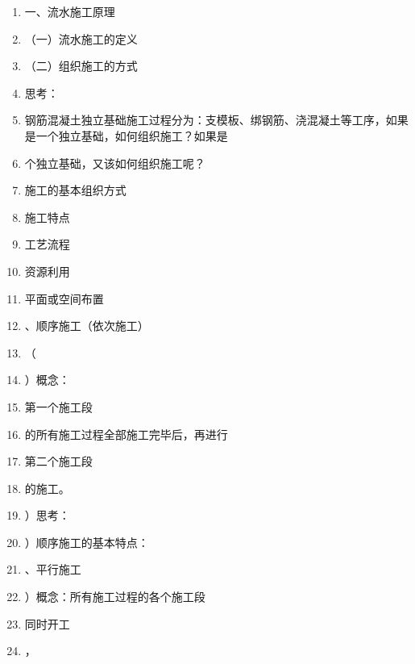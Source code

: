\documentclass[UTF8,fontset=fandol,11pt]{ctexart}
\begin{document}
\begin{enumerate}[label=\arabic*.]

\item 一、流水施工原理

\item （一）流水施工的定义

\item （二）组织施工的方式

\item 思考：

\item 钢筋混凝土独立基础施工过程分为：支模板、绑钢筋、浇混凝土等工序，如果是一个独立基础，如何组织施工？如果是

\item 个独立基础，又该如何组织施工呢？

\item 施工的基本组织方式

\item 施工特点

\item 工艺流程

\item 资源利用

\item 平面或空间布置

\item 、顺序施工（依次施工）

\item （

\item ）概念：

\item 第一个施工段

\item 的所有施工过程全部施工完毕后，再进行

\item 第二个施工段

\item 的施工。

\item ）思考：

\item ）顺序施工的基本特点：

\item 、平行施工

\item ）概念：所有施工过程的各个施工段

\item 同时开工

\item ，

\end{enumerate}
\end{document}
